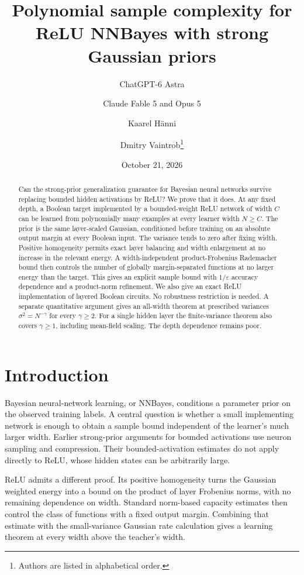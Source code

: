 \documentclass[11pt]{article}
\title{Polynomial sample complexity for ReLU NNBayes with strong Gaussian priors}
\author{ChatGPT-6 Astra \and Claude Fable 5 and Opus 5 \and Kaarel H\"anni \and Dmitry Vaintrob\thanks{Authors are listed in alphabetical order.}}
\date{October 21, 2026}
\theoremstyle{remark}\newtheorem{remark}[theorem]{Remark}
\begin{document}
\maketitle
\begin{abstract}
Can the strong-prior generalization guarantee for Bayesian neural networks survive replacing bounded hidden activations by ReLU? We prove that it does. At any fixed depth, a Boolean target implemented by a bounded-weight ReLU network of width $C$ can be learned from polynomially many examples at every learner width $N\ge C$. The prior is the same layer-scaled Gaussian, conditioned before training on an absolute output margin at every Boolean input. The variance tends to zero after fixing width. Positive homogeneity permits exact layer balancing and width enlargement at no increase in the relevant energy. A width-independent product-Frobenius Rademacher bound then controls the number of globally margin-separated functions at no larger energy than the target. This gives an explicit sample bound with $1/\varepsilon$ accuracy dependence and a product-norm refinement. We also give an exact ReLU implementation of layered Boolean circuits. No robustness restriction is needed. A separate quantitative argument gives an all-width theorem at prescribed variances $\sigma^2=N^{-\gamma}$ for every $\gamma\ge2$. For a single hidden layer the finite-variance theorem also covers $\gamma\ge1$, including mean-field scaling. The depth dependence remains poor.
\end{abstract}

\section{Introduction}
Bayesian neural-network learning, or NNBayes, conditions a parameter prior on the observed training labels. A central question is whether a small implementing network is enough to obtain a sample bound independent of the learner's much larger width. Earlier strong-prior arguments for bounded activations use neuron sampling and compression. Their bounded-activation estimates do not apply directly to ReLU, whose hidden states can be arbitrarily large.

ReLU admits a different proof. Its positive homogeneity turns the Gaussian weighted energy into a bound on the product of layer Frobenius norms, with no remaining dependence on width. Standard norm-based capacity estimates then control the class of functions with a fixed output margin. Combining that estimate with the small-variance Gaussian rate calculation gives a learning theorem at every width above the teacher's width.
\end{document}
